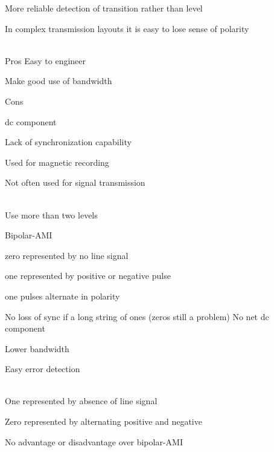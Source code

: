 \begin{description}
  \ite More reliable detection of transition rather than level

  \ite In complex transmission layouts it is easy to lose sense of polarity

\ei


\os{\newpage}\item[{\rot\bf  NRZ pros and cons }]~\\[-3ex]

\bi
  \ite Pros
\ei
\bi
 \ite Easy to engineer
 \ei


\bi
  \ite Make good use of bandwidth

  \ite Cons

\ei
\bi
 \ite dc component
 \ei

\bi
 \ite Lack of synchronization capability
 \ei


\bi
  \ite Used for magnetic recording

  \ite Not often used for signal transmission

\ei


\os{\newpage}\item[{\rot\bf  Multilevel Binary }]~\\[-3ex]

\bi
  \ite Use more than two levels

  \ite Bipolar-AMI

\ei
\bi
 \ite zero represented by no line signal
 \ei

\bi
 \ite one represented by positive or negative pulse
 \ei

\bi
 \ite one pulses alternate in polarity
 \ei


\bi
  \ite No loss of sync if a long string of ones (zeros still a problem)
\ei
\bi
 \ite No net dc component
 \ei

\bi
 \ite Lower bandwidth
 \ei

\bi
 \ite Easy error detection
 \ei



\os{\newpage}\item[{\rot\bf  Pseudoternary }]~\\[-3ex]

\bi
  \ite One represented by absence of line signal

  \ite Zero represented by alternating positive and negative

  \ite No advantage or disadvantage over bipolar-AMI

\ei


\os{\newpage}\item[{\rot\bf  Bipolar-AMI and Pseudoternary }]~\\[-3ex]



\end{description}
